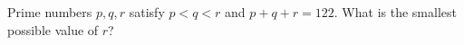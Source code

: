 Prime numbers $p, q, r$ satisfy $p<q<r$ and $p+q+r=122$. What is the smallest possible value of $r$?
